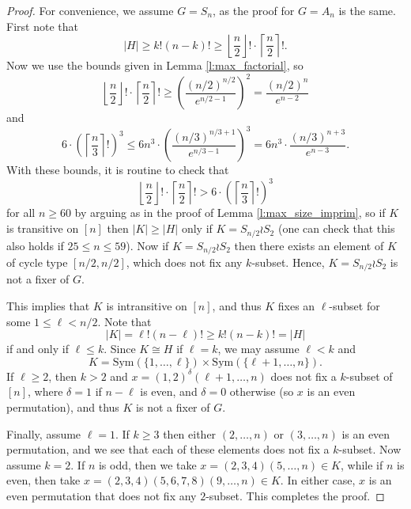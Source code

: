 \documentclass[twoside,a4paper,reqno,11pt]{amsart}
\newcommand{\<}{\langle}
\renewcommand{\>}{\rangle}
\newcommand{\leqs}{\leqslant}
\newcommand{\geqs}{\geqslant}
\theoremstyle{definition}
\begin{document}
	\begin{proof}
		For convenience, we assume $G = S_n$, as the proof for $G = A_n$ is the same. First note that
		\begin{equation*}
		|H|\geqs k!(n-k)!\geqs  \left\lfloor\frac{n}{2}\right\rfloor!\cdot \left\lceil \frac{n}{2}\right\rceil!.
		\end{equation*}
		Now we use the bounds given in Lemma \ref{l:max_factorial}, so
		\begin{equation*}
		\left\lfloor\frac{n}{2}\right\rfloor!\cdot \left\lceil \frac{n}{2}\right\rceil! \geqs \left(\frac{(n/2)^{n/2}}{e^{n/2-1}}\right)^2 = \frac{(n/2)^n}{e^{n-2}}
		\end{equation*}
		and
		\begin{equation*}
		6\cdot \left(\left\lceil \frac{n}{3}\right\rceil!\right)^3\leqs 6n^3\cdot\left(\frac{(n/3)^{n/3+1}}{e^{n/3-1}}\right)^3 = 6n^3\cdot \frac{(n/3)^{n+3}}{e^{n-3}}.
		\end{equation*}
		With these bounds, it is routine to check that
		\begin{equation*}
		\left\lfloor\frac{n}{2}\right\rfloor!\cdot \left\lceil \frac{n}{2}\right\rceil! > 6\cdot \left(\left\lceil \frac{n}{3}\right\rceil!\right)^3
		\end{equation*}
		for all $n\geqs 60$ by arguing as in the proof of Lemma \ref{l:max_size_imprim}, so if $K$ is transitive on $[n]$ then $|K|\geqs |H|$ only if $K = S_{n/2}\wr S_2$ (one can check that this also holds if $25\leqs n\leqs 59$). Now if $K = S_{n/2}\wr S_2$ then there exists an element of $K$ of cycle type $[n/2,n/2]$, which does not fix any $k$-subset. Hence, $K = S_{n/2}\wr S_2$ is not a fixer of $G$.
		
		This implies that $K$ is intransitive on $[n]$, and thus $K$ fixes an $\ell$-subset for some $1\leqs \ell < n/2$. Note that
		\begin{equation*}
		|K| = \ell!(n-\ell)! \geqs k!(n-k)! = |H|
		\end{equation*}
		if and only if $\ell \leqs k$. Since $K\cong H$ if $\ell = k$, we may assume $\ell < k$ and
		\begin{equation*}
		K = \mathrm{Sym}(\{1,\dots,\ell\})\times \mathrm{Sym}(\{\ell+1,\dots,n\}).
		\end{equation*}
		If $\ell\geqs 2$, then $k > 2$ and  $x = (1,2)^\delta(\ell+1,\dots,n)$ does not fix a $k$-subset of $[n]$, where $\delta = 1$ if $n-\ell$ is even, and $\delta = 0$ otherwise (so $x$ is an even permutation), and thus $K$ is not a fixer of $G$.
		
		Finally, assume $\ell = 1$. If $k \geqs 3$ then either $(2,\dots,n)$ or $(3,\dots,n)$ is an even permutation, and we see that each of these elements does not fix a $k$-subset. Now assume $k = 2$. If $n$ is odd, then we take $x = (2,3,4)(5,\dots,n)\in K$, while if $n$ is even, then take $x = (2,3,4)(5,6,7,8)(9,\dots,n)\in K$. In either case, $x$ is an even permutation that does not fix any $2$-subset. This completes the proof.
	\end{proof}
	
\end{document}
